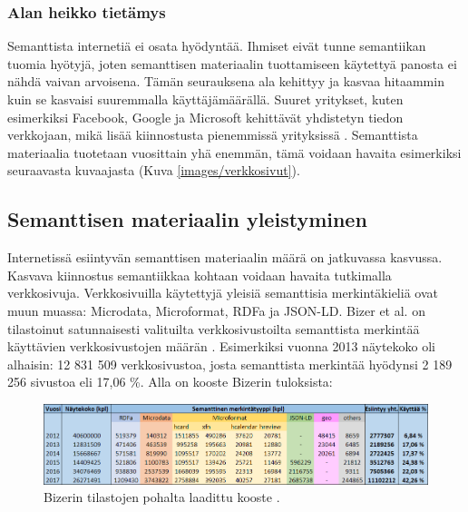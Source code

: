 \documentclass[finnish, 12pt, a4paper, elec, utf8, pdfa, online]{aaltothesis}
\begin{document}
{\subsubsection{Alan heikko tietämys}
Semanttista internetiä ei osata hyödyntää. Ihmiset eivät tunne semantiikan tuomia hyötyjä, joten semanttisen materiaalin tuottamiseen käytettyä panosta ei nähdä vaivan arvoisena. Tämän seurauksena ala kehittyy ja kasvaa hitaammin kuin se kasvaisi suuremmalla käyttäjämäärällä. Suuret yritykset, kuten esimerkiksi Facebook, Google ja Microsoft kehittävät yhdistetyn tiedon verkkojaan, mikä lisää kiinnostusta pienemmissä yrityksissä \cite{Facebook} \cite{knowledge_graph} \cite{cortana}. Semanttista materiaalia tuotetaan vuosittain yhä enemmän, tämä voidaan havaita esimerkiksi seuraavasta kuvaajasta (Kuva \ref{images/verkkosivut}).


\subsection{Semanttisen materiaalin yleistyminen}

Internetissä esiintyvän semanttisen materiaalin määrä on jatkuvassa kasvussa. Kasvava kiinnostus semantiikkaa kohtaan voidaan havaita tutkimalla verkkosivuja. Verkkosivuilla käytettyjä yleisiä semanttisia merkintäkieliä ovat muun muassa: Microdata, Microformat, RDFa ja JSON-LD. Bizer et al. on tilastoinut satunnaisesti valituilta verkkosivustoilta semanttista merkintää käyttävien verkkosivustojen määrän \cite{rdfa_usage}. Esimerkiksi vuonna 2013 näytekoko oli alhaisin: 12 831 509 verkkosivustoa, josta semanttista merkintää hyödynsi 2 189 256 sivustoa eli 17,06 \%. Alla on kooste Bizerin tuloksista:

\begin{figure}[htb]
\centering
\includegraphics[width=15cm]{images/taulukko.png}
\caption{Bizerin tilastojen pohalta laadittu kooste \cite{rdfa_usage}. \label{images/taulukko}}
\end{figure}

}
\end{document}
